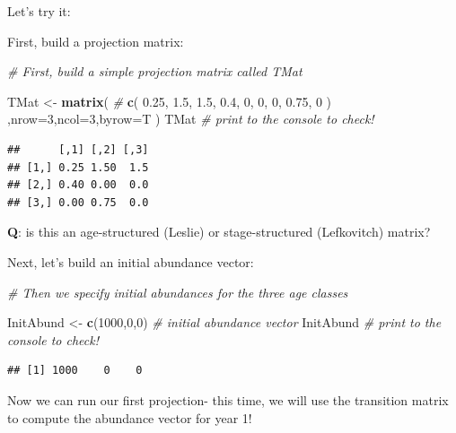 \documentclass[
]{article}
\newenvironment{Shaded}{\begin{snugshade}}{\end{snugshade}}
\newcommand{\AttributeTok}[1]{\textcolor[rgb]{0.13,0.29,0.53}{#1}}
\newcommand{\CommentTok}[1]{\textcolor[rgb]{0.56,0.35,0.01}{\textit{#1}}}
\newcommand{\DecValTok}[1]{\textcolor[rgb]{0.00,0.00,0.81}{#1}}
\newcommand{\FloatTok}[1]{\textcolor[rgb]{0.00,0.00,0.81}{#1}}
\newcommand{\FunctionTok}[1]{\textcolor[rgb]{0.13,0.29,0.53}{\textbf{#1}}}
\newcommand{\NormalTok}[1]{#1}
\newcommand{\OtherTok}[1]{\textcolor[rgb]{0.56,0.35,0.01}{#1}}
\begin{document}
Let's try it:

First, build a projection matrix:

\begin{Shaded}
\begin{Highlighting}[]
\CommentTok{\# First, build a simple projection matrix called TMat}

\NormalTok{TMat }\OtherTok{\textless{}{-}} \FunctionTok{matrix}\NormalTok{(     }\CommentTok{\# }
  \FunctionTok{c}\NormalTok{(}
    \FloatTok{0.25}\NormalTok{,     }\FloatTok{1.5}\NormalTok{,   }\FloatTok{1.5}\NormalTok{,}
    \FloatTok{0.4}\NormalTok{,   }\DecValTok{0}\NormalTok{,     }\DecValTok{0}\NormalTok{,}
    \DecValTok{0}\NormalTok{,     }\FloatTok{0.75}\NormalTok{,   }\DecValTok{0}
\NormalTok{  )}
\NormalTok{  ,}\AttributeTok{nrow=}\DecValTok{3}\NormalTok{,}\AttributeTok{ncol=}\DecValTok{3}\NormalTok{,}\AttributeTok{byrow=}\NormalTok{T}
\NormalTok{)}
\NormalTok{TMat    }\CommentTok{\# print to the console to check!}
\end{Highlighting}
\end{Shaded}

\begin{verbatim}
##      [,1] [,2] [,3]
## [1,] 0.25 1.50  1.5
## [2,] 0.40 0.00  0.0
## [3,] 0.00 0.75  0.0
\end{verbatim}

\textbf{Q}: is this an age-structured (Leslie) or stage-structured
(Lefkovitch) matrix?

Next, let's build an initial abundance vector:

\begin{Shaded}
\begin{Highlighting}[]
\CommentTok{\# Then we specify initial abundances for the three age classes}

\NormalTok{InitAbund }\OtherTok{\textless{}{-}} \FunctionTok{c}\NormalTok{(}\DecValTok{1000}\NormalTok{,}\DecValTok{0}\NormalTok{,}\DecValTok{0}\NormalTok{)    }\CommentTok{\# initial abundance vector}
\NormalTok{InitAbund    }\CommentTok{\# print to the console to check!}
\end{Highlighting}
\end{Shaded}

\begin{verbatim}
## [1] 1000    0    0
\end{verbatim}

Now we can run our first projection- this time, we will use the
transition matrix to compute the abundance vector for year 1!
\end{document}
